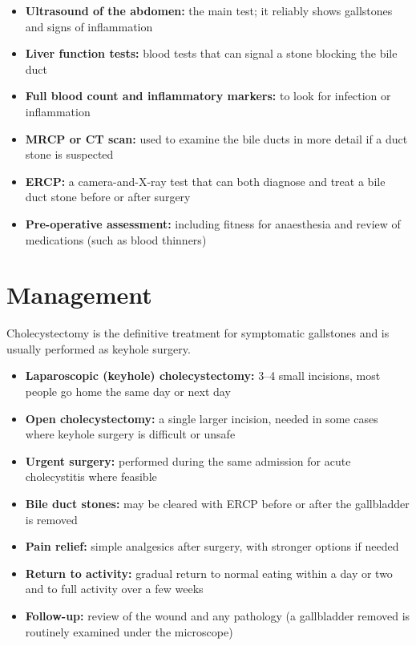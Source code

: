 \begin{itemize}
    \item \textbf{Ultrasound of the abdomen:} the main test; it reliably shows gallstones and signs of inflammation
    \item \textbf{Liver function tests:} blood tests that can signal a stone blocking the bile duct
    \item \textbf{Full blood count and inflammatory markers:} to look for infection or inflammation
    \item \textbf{MRCP or CT scan:} used to examine the bile ducts in more detail if a duct stone is suspected
    \item \textbf{ERCP:} a camera-and-X-ray test that can both diagnose and treat a bile duct stone before or after surgery
    \item \textbf{Pre-operative assessment:} including fitness for anaesthesia and review of medications (such as blood thinners)
\end{itemize}

\section*{Management}
Cholecystectomy is the definitive treatment for symptomatic gallstones and is usually performed as keyhole surgery.

\begin{itemize}
    \item \textbf{Laparoscopic (keyhole) cholecystectomy:} 3--4 small incisions, most people go home the same day or next day
    \item \textbf{Open cholecystectomy:} a single larger incision, needed in some cases where keyhole surgery is difficult or unsafe
    \item \textbf{Urgent surgery:} performed during the same admission for acute cholecystitis where feasible
    \item \textbf{Bile duct stones:} may be cleared with ERCP before or after the gallbladder is removed
    \item \textbf{Pain relief:} simple analgesics after surgery, with stronger options if needed
    \item \textbf{Return to activity:} gradual return to normal eating within a day or two and to full activity over a few weeks
    \item \textbf{Follow-up:} review of the wound and any pathology (a gallbladder removed is routinely examined under the microscope)
\end{itemize}


